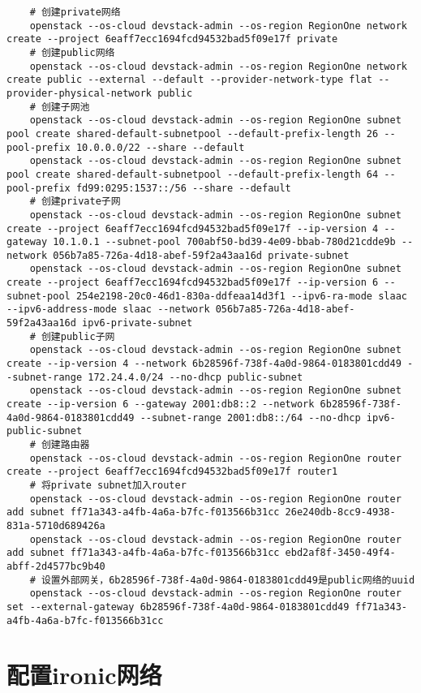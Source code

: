 \documentclass[a4paper,left=1.5cm,right=1.5cm,11pt]{article}
\begin{document}
	\begin{lstlisting}
	# 创建private网络
	openstack --os-cloud devstack-admin --os-region RegionOne network create --project 6eaff7ecc1694fcd94532bad5f09e17f private
	# 创建public网络
	openstack --os-cloud devstack-admin --os-region RegionOne network create public --external --default --provider-network-type flat --provider-physical-network public
	# 创建子网池
	openstack --os-cloud devstack-admin --os-region RegionOne subnet pool create shared-default-subnetpool --default-prefix-length 26 --pool-prefix 10.0.0.0/22 --share --default
	openstack --os-cloud devstack-admin --os-region RegionOne subnet pool create shared-default-subnetpool --default-prefix-length 64 --pool-prefix fd99:0295:1537::/56 --share --default
	# 创建private子网
	openstack --os-cloud devstack-admin --os-region RegionOne subnet create --project 6eaff7ecc1694fcd94532bad5f09e17f --ip-version 4 --gateway 10.1.0.1 --subnet-pool 700abf50-bd39-4e09-bbab-780d21cdde9b --network 056b7a85-726a-4d18-abef-59f2a43aa16d private-subnet
	openstack --os-cloud devstack-admin --os-region RegionOne subnet create --project 6eaff7ecc1694fcd94532bad5f09e17f --ip-version 6 --subnet-pool 254e2198-20c0-46d1-830a-ddfeaa14d3f1 --ipv6-ra-mode slaac --ipv6-address-mode slaac --network 056b7a85-726a-4d18-abef-59f2a43aa16d ipv6-private-subnet
	# 创建public子网
	openstack --os-cloud devstack-admin --os-region RegionOne subnet create --ip-version 4 --network 6b28596f-738f-4a0d-9864-0183801cdd49 --subnet-range 172.24.4.0/24 --no-dhcp public-subnet
	openstack --os-cloud devstack-admin --os-region RegionOne subnet create --ip-version 6 --gateway 2001:db8::2 --network 6b28596f-738f-4a0d-9864-0183801cdd49 --subnet-range 2001:db8::/64 --no-dhcp ipv6-public-subnet
	# 创建路由器
	openstack --os-cloud devstack-admin --os-region RegionOne router create --project 6eaff7ecc1694fcd94532bad5f09e17f router1
	# 将private subnet加入router
	openstack --os-cloud devstack-admin --os-region RegionOne router add subnet ff71a343-a4fb-4a6a-b7fc-f013566b31cc 26e240db-8cc9-4938-831a-5710d689426a
	openstack --os-cloud devstack-admin --os-region RegionOne router add subnet ff71a343-a4fb-4a6a-b7fc-f013566b31cc ebd2af8f-3450-49f4-abff-2d4577bc9b40
	# 设置外部网关，6b28596f-738f-4a0d-9864-0183801cdd49是public网络的uuid
	openstack --os-cloud devstack-admin --os-region RegionOne router set --external-gateway 6b28596f-738f-4a0d-9864-0183801cdd49 ff71a343-a4fb-4a6a-b7fc-f013566b31cc
	\end{lstlisting}

\section{配置ironic网络}
\end{document}
